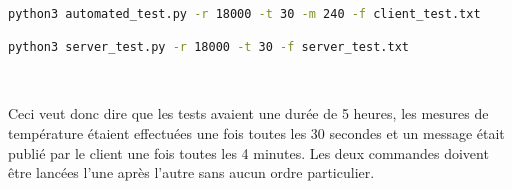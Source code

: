 ~

\begin{lstlisting}[language=bash, caption=Commande client]
python3 automated_test.py -r 18000 -t 30 -m 240 -f client_test.txt
\end{lstlisting}


\begin{lstlisting}[language=bash, caption=Commande serveur]
python3 server_test.py -r 18000 -t 30 -f server_test.txt
\end{lstlisting}

~

\noindent
Ceci veut donc dire que les tests avaient une durée de 5 heures, les mesures de température étaient effectuées une fois toutes les 30 secondes et un message était publié par le client une fois toutes les 4 minutes. Les deux commandes doivent être lancées l'une après l'autre sans aucun ordre particulier.
